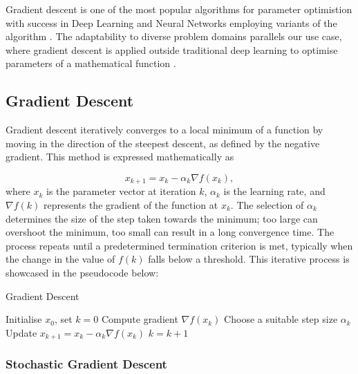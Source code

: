 \documentclass[a4paper]{report}
\begin{document}
Gradient descent is one of the most popular algorithms for parameter optimistion with success in Deep Learning and Neural Networks employing variants of the algorithm \citep{lu2017improved, zhang2019gradient, zeebaree2019trainable}. The adaptability to diverse problem domains \citep{YingjieYugiHaibin2023SGD} parallels our use case, where gradient descent is applied outside traditional deep learning to optimise parameters of a mathematical function \citep{GradientBasedOpt2022}.

\subsection{Gradient Descent}
Gradient descent iteratively converges to a local minimum of a function by moving in the direction of the steepest descent, as defined by the negative gradient. This method is expressed mathematically as

\begin{equation}\label{GD}
    x_{k+1} = x_k - \alpha_k \nabla f(x_k),
\end{equation}
where $x_k$ is the parameter vector at iteration $k$, $\alpha_k$ is the learning rate, and $\nabla f(k)$ represents the gradient of the function at $x_k$. The selection of $\alpha_k$ determines the size of the step taken towards the minimum; too large can overshoot the minimum, too small can result in a long convergence time. The process repeats until a predetermined termination criterion is met, typically when the change in the value of $f(k)$ falls below a threshold. This iterative process is showcased in the pseudocode below:

\begin{algorithm}
\caption{Gradient Descent}
\begin{algorithmic}[1]
\State Initialise \( x_0 \), set \( k = 0 \)
    \State Compute gradient \( \nabla f(x_k) \)
    \State Choose a suitable step size \( \alpha_k \)
    \State Update \( x_{k+1} = x_k - \alpha_k \nabla f(x_k) \)
    \State \( k = k + 1 \)
\EndWhile
\end{algorithmic}
\end{algorithm}

\subsubsection{Stochastic Gradient Descent}
\end{document}
